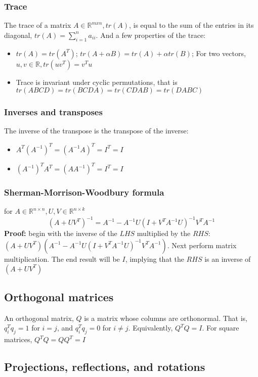 \documentclass{article}
\begin{document}
\subsubsection{Trace}
The trace of a matrix $A \in \mathbb{R}^{mxn}, tr(A)$, is equal to the sum of the entries in its diagonal, $tr(A) = \sum_{i = 1}^n a_{ii}$. And a few properties of the trace:
\begin{itemize}
    \item $tr(A) = tr(A^T)$; $tr(A + \alpha B) = tr(A) + \alpha tr(B)$; For two vectors, $u, v \in \mathbb{R}, tr(uv^T) = v^Tu$
    \item Trace is invariant under cyclic permutations, that is $tr(ABCD) = tr(BCDA) = tr(CDAB) = tr(DABC)$
\end{itemize}

\subsubsection{Inverses and transposes}
The inverse of the transpose is the transpose of the inverse:
\begin{itemize}
    \item $A^T(A^{-1})^T = (A^{-1}A)^T = I^T = I$
    \item $(A^{-1})^TA^T = (AA^{-1})^T = I^T = I$
\end{itemize}
\subsubsection{Sherman-Morrison-Woodbury formula} 
for $A\in \mathbb{R}^{n\times n}, U,V \in \mathbb{R}^{n\times k}$
\begin{equation*}
    (A+UV^T)^{-1} = A^{-1} - A^{-1}U(I+V^TA^{-1}U)^{-1}V^TA^{-1} 
\end{equation*}
\textbf{Proof:} begin with the inverse of the $LHS$ multiplied by the $RHS$: $(A+UV^T) (A^{-1} - A^{-1}U(I+V^TA^{-1}U)^{-1}V^TA^{-1})$. Next perform matrix multiplication. The end result will be $I$, implying that the $RHS$ is an inverse of $(A+UV^T)$

\subsection{Orthogonal matrices}
An orthogonal matrix, $Q$ is a matrix whose columns are orthonormal. That is, $q_i^Tq_j = 1$ for $i=j$, and $q_i^Tq_j = 0$ for $i\neq j$. Equivalently, $Q^TQ = I$. For square matrices, $Q^TQ = QQ^T = I$

\subsection{Projections, reflections, and rotations}
\end{document}
